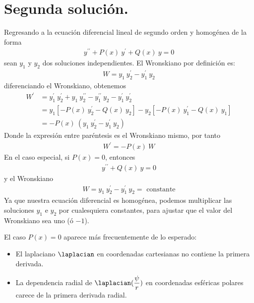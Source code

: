 \section{Segunda solución.}
Regresando a la ecuación diferencial lineal de segundo orden y homogénea de la forma
\begin{align}
y^{\prime \prime} + P(x) \: y^{\prime} + Q(x) \: y = 0
\label{eq:ecuacion_09_118}
\end{align}
sean $y_{1}$ y $y_{2}$ dos soluciones independientes. El Wronskiano por definición es:
\begin{align}
W = y_{1} \: y^{\prime}_{2} - y^{\prime}_{1} \: y_{2}
\label{eq:ecuacion_09_119}
\end{align}
diferenciando el Wronskiano, obtenemos
\begin{align*}
W^{\prime} &= y^{\prime}_{1} \: y_{2}^{\prime} + y_{1} \: y^{\prime \prime}_{2} - y^{\prime \prime}_{1} \: y_{2} - y^{\prime}_{1} \: y^{\prime}_{2} \\
&= y_{1} [ - P(x) \: y^{\prime}_{2} - Q(x) \: y_{2}] - y_{2} [ - P(x) \: y^{\prime}_{1} - Q(x)  \: y_{1}] \\
&= - P(x) \: (y_{1} \: y^{\prime}_{2} - y^{\prime}_{1} \: y_{2})
\end{align*}
Donde la expresión entre paréntesis es el Wronskiano mismo, por tanto
\begin{align}
W^{\prime} = - P(x) \: W
\label{eq:ecuacion_09_120}
\end{align}
En el caso especial, si $P(x) = 0$, entonces
\begin{align}
y^{\prime \prime} + Q(x) \: y = 0
\label{eq:ecuacion_09_121}
\end{align}
y el Wronskiano
\begin{align}
W = y_{1} \: y^{\prime}_{2} - y^{\prime}_{1} \: y_{2} = \mbox{ constante}
\label{eq:ecuacion_09_1202}
\end{align}
Ya que nuestra ecuación diferencial es homogénea, podemos multiplicar las soluciones $y_{1}$ e $y_{2}$ por cualesquiera constantes, para ajustar que el valor del Wronskiano sea uno (ó $-1$).
\par
El caso $P(x) = 0$ aparece más frecuentemente de lo esperado:
\begin{itemize}
\item El laplaciano $\laplacian$ en coordenadas cartesianas no contiene la primera derivada.
\item La dependencia radial de $\laplacian (\dfrac{\psi}{r})$ en coordenadas esféricas polares carece de la primera derivada radial.
\end{itemize}
